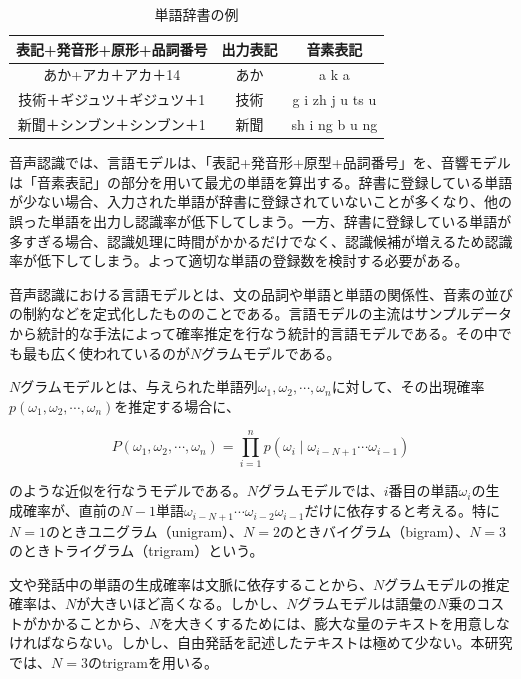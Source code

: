 \begin{table}[H]
  \begin{center}
    \caption{単語辞書の例}
    \begin{tabular}{|c||c|c|} \hline
      表記+発音形+原形+品詞番号 & 出力表記 & 音素表記 \\ \hline
      あか+アカ＋アカ＋14 & あか & a k a \\ \hline
      技術＋ギジュツ＋ギジュツ＋1 & 技術 & g i zh j u ts u \\ \hline
      新聞＋シンブン＋シンブン＋1 & 新聞 & sh i ng b u ng \\ \hline
    \end{tabular}
    \label{table:tango}
  \end{center}
\end{table}

音声認識では、言語モデルは、「表記+発音形+原型+品詞番号」を、音響モデルは「音素表記」の部分を用いて最尤の単語を算出する。辞書に登録している単語が少ない場合、入力された単語が辞書に登録されていないことが多くなり、他の誤った単語を出力し認識率が低下してしまう。一方、辞書に登録している単語が多すぎる場合、認識処理に時間がかかるだけでなく、認識候補が増えるため認識率が低下してしまう。よって適切な単語の登録数を検討する必要がある。\vspace{0.2in}

\par
音声認識における言語モデルとは、文の品詞や単語と単語の関係性、音素の並びの制約などを定式化したもののことである。言語モデルの主流はサンプルデータから統計的な手法によって確率推定を行なう統計的言語モデルである。その中でも最も広く使われているのが$N$グラムモデルである。\vspace{0.2in}

\par
$N$グラムモデルとは、与えられた単語列$\omega_1,\omega_2,\cdots,\omega_n$に対して、その出現確率$p(\omega_1,\omega_2,\cdots,\omega_n)$を推定する場合に、

\begin{equation}
P(\omega_1,\omega_2,\cdots,\omega_n)=\prod_{i=1}^{n}p(\omega_{i}\mid \omega_{i-N+1}\cdots \omega_{i-1})
\end{equation}

のような近似を行なうモデルである。$N$グラムモデルでは、$i$番目の単語$ω_i$の生成確率が、直前の$N-1$単語$ω_{i-N+1}\cdots ω_{i-2}ω_{i-1}$だけに依存すると考える。特に$N = 1$のときユニグラム（unigram）、$N = 2$のときバイグラム（bigram）、$N = 3$のときトライグラム（trigram）という。\par
文や発話中の単語の生成確率は文脈に依存することから、$N$グラムモデルの推定確率は、$N$が大きいほど高くなる。しかし、$N$グラムモデルは語彙の$N$乗のコストがかかることから、$N$を大きくするためには、膨大な量のテキストを用意しなければならない。しかし、自由発話を記述したテキストは極めて少ない。本研究では、$N = 3$のtrigramを用いる。\par



